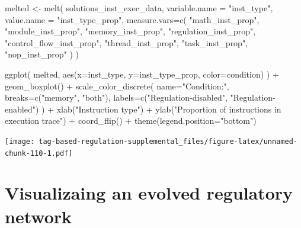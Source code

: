 \documentclass[
]{book}
\newenvironment{Shaded}{\begin{snugshade}}{\end{snugshade}}
\newcommand{\AttributeTok}[1]{\textcolor[rgb]{0.77,0.63,0.00}{#1}}
\newcommand{\FunctionTok}[1]{\textcolor[rgb]{0.00,0.00,0.00}{#1}}
\newcommand{\NormalTok}[1]{#1}
\newcommand{\OtherTok}[1]{\textcolor[rgb]{0.56,0.35,0.01}{#1}}
\newcommand{\SpecialCharTok}[1]{\textcolor[rgb]{0.00,0.00,0.00}{#1}}
\newcommand{\StringTok}[1]{\textcolor[rgb]{0.31,0.60,0.02}{#1}}
\begin{document}
\begin{Shaded}
\begin{Highlighting}[]
\NormalTok{melted }\OtherTok{\textless{}{-}} \FunctionTok{melt}\NormalTok{(}
\NormalTok{  solutions\_inst\_exec\_data,}
  \AttributeTok{variable.name =} \StringTok{"inst\_type"}\NormalTok{,}
  \AttributeTok{value.name =} \StringTok{"inst\_type\_prop"}\NormalTok{,}
  \AttributeTok{measure.vars=}\FunctionTok{c}\NormalTok{(}
    \StringTok{"math\_inst\_prop"}\NormalTok{,}
    \StringTok{"module\_inst\_prop"}\NormalTok{,}
    \StringTok{"memory\_inst\_prop"}\NormalTok{,}
    \StringTok{"regulation\_inst\_prop"}\NormalTok{,}
    \StringTok{"control\_flow\_inst\_prop"}\NormalTok{,}
    \StringTok{"thread\_inst\_prop"}\NormalTok{,}
    \StringTok{"task\_inst\_prop"}\NormalTok{,}
    \StringTok{"nop\_inst\_prop"}
\NormalTok{  )}
\NormalTok{)}

\FunctionTok{ggplot}\NormalTok{( melted, }\FunctionTok{aes}\NormalTok{(}\AttributeTok{x=}\NormalTok{inst\_type, }\AttributeTok{y=}\NormalTok{inst\_type\_prop, }\AttributeTok{color=}\NormalTok{condition) ) }\SpecialCharTok{+}
  \FunctionTok{geom\_boxplot}\NormalTok{() }\SpecialCharTok{+}
  \FunctionTok{scale\_color\_discrete}\NormalTok{(}
    \AttributeTok{name=}\StringTok{"Condition:"}\NormalTok{,}
    \AttributeTok{breaks=}\FunctionTok{c}\NormalTok{(}\StringTok{"memory"}\NormalTok{, }\StringTok{"both"}\NormalTok{),}
    \AttributeTok{labels=}\FunctionTok{c}\NormalTok{(}\StringTok{"Regulation{-}disabled"}\NormalTok{, }\StringTok{"Regulation{-}enabled"}\NormalTok{)}
\NormalTok{  ) }\SpecialCharTok{+}
  \FunctionTok{xlab}\NormalTok{(}\StringTok{"Instruction type"}\NormalTok{) }\SpecialCharTok{+}
  \FunctionTok{ylab}\NormalTok{(}\StringTok{"Proportion of instructions in execution trace"}\NormalTok{) }\SpecialCharTok{+}
  \FunctionTok{coord\_flip}\NormalTok{() }\SpecialCharTok{+}
  \FunctionTok{theme}\NormalTok{(}\AttributeTok{legend.position=}\StringTok{"bottom"}\NormalTok{)}
\end{Highlighting}
\end{Shaded}

\texttt{[image: tag-based-regulation-supplemental\_files/figure-latex/unnamed-chunk-110-1.pdf]}

\hypertarget{visualizaing-an-evolved-regulatory-network-1}{%
\section{Visualizaing an evolved regulatory network}\label{visualizaing-an-evolved-regulatory-network-1}}
\end{document}
